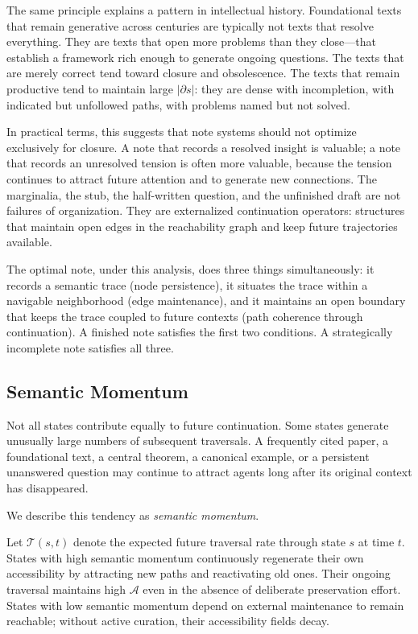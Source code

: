 \documentclass[12pt]{article}
\begin{document}
The same principle explains a pattern in intellectual history.
Foundational texts that remain generative across centuries are typically
not texts that resolve everything.
They are texts that open more problems than they close---that establish
a framework rich enough to generate ongoing questions.
The texts that are merely correct tend toward closure and obsolescence.
The texts that remain productive tend to maintain large $|\partial s|$:
they are dense with incompletion, with indicated but unfollowed paths,
with problems named but not solved.

In practical terms, this suggests that note systems should not optimize
exclusively for closure.
A note that records a resolved insight is valuable; a note that records
an unresolved tension is often more valuable, because the tension
continues to attract future attention and to generate new connections.
The marginalia, the stub, the half-written question, and the unfinished
draft are not failures of organization.
They are externalized continuation operators: structures that maintain
open edges in the reachability graph and keep future trajectories
available.

The optimal note, under this analysis, does three things simultaneously:
it records a semantic trace (node persistence), it situates the trace
within a navigable neighborhood (edge maintenance), and it maintains an
open boundary that keeps the trace coupled to future contexts (path
coherence through continuation).
A finished note satisfies the first two conditions.
A strategically incomplete note satisfies all three.

\subsection{Semantic Momentum}

Not all states contribute equally to future continuation.
Some states generate unusually large numbers of subsequent traversals.
A frequently cited paper, a foundational text, a central theorem, a
canonical example, or a persistent unanswered question may continue to
attract agents long after its original context has disappeared.

We describe this tendency as \emph{semantic momentum}.

Let $\mathcal{T}(s, t)$ denote the expected future traversal rate through
state $s$ at time $t$.
States with high semantic momentum continuously regenerate their own
accessibility by attracting new paths and reactivating old ones.
Their ongoing traversal maintains high $\mathcal{A}$ even in the absence
of deliberate preservation effort.
States with low semantic momentum depend on external maintenance to remain
reachable; without active curation, their accessibility fields decay.
\end{document}
